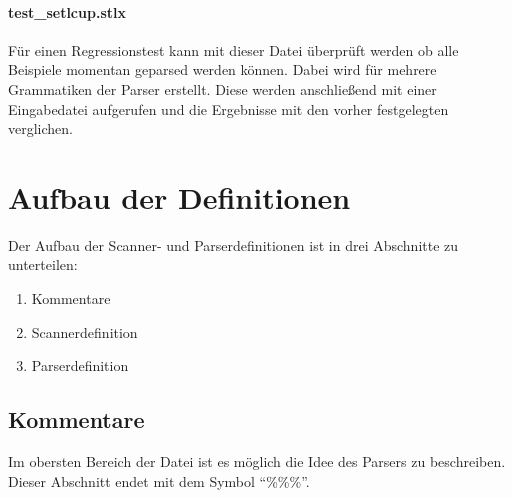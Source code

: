 \paragraph{test\_setlcup.stlx} Für einen Regressionstest kann mit dieser Datei überprüft werden ob alle Beispiele momentan geparsed werden können. Dabei wird für mehrere Grammatiken der Parser erstellt. Diese werden anschließend mit einer Eingabedatei aufgerufen und die Ergebnisse mit den vorher festgelegten verglichen.
\section{Aufbau der Definitionen}

Der Aufbau der Scanner- und Parserdefinitionen ist in drei Abschnitte zu unterteilen:
\begin{enumerate}
	\item Kommentare
	\item Scannerdefinition
	\item Parserdefinition
\end{enumerate}
\subsection{Kommentare}
Im obersten Bereich der Datei ist es möglich die Idee des Parsers zu beschreiben.
Dieser Abschnitt endet mit dem Symbol "`\%\%\%"'. 
